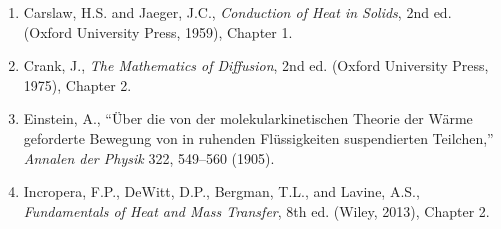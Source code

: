 \begin{enumerate}
\item Carslaw, H.S. and Jaeger, J.C., \textit{Conduction of Heat in Solids}, 2nd ed. (Oxford University Press, 1959), Chapter 1.
\item Crank, J., \textit{The Mathematics of Diffusion}, 2nd ed. (Oxford University Press, 1975), Chapter 2.
\item Einstein, A., ``\"Uber die von der molekularkinetischen Theorie der W\"arme geforderte Bewegung von in ruhenden Fl\"ussigkeiten suspendierten Teilchen,'' \textit{Annalen der Physik} 322, 549--560 (1905).
\item Incropera, F.P., DeWitt, D.P., Bergman, T.L., and Lavine, A.S., \textit{Fundamentals of Heat and Mass Transfer}, 8th ed. (Wiley, 2013), Chapter 2.
\end{enumerate}


